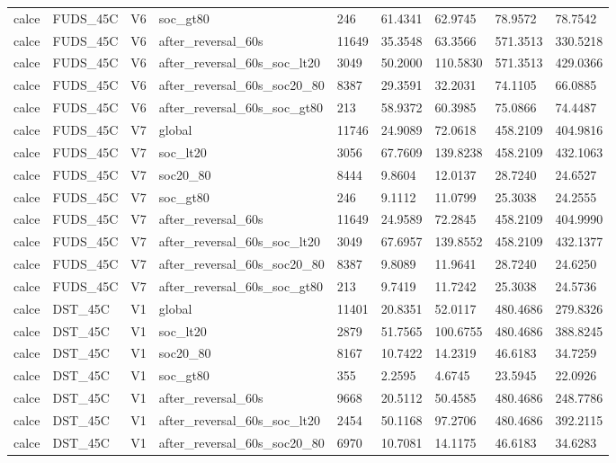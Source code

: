 \begin{tabular}{lllllllll}
calce & FUDS\_45C & V6 & soc\_gt80 & 246 & 61.4341 & 62.9745 & 78.9572 & 78.7542 \\
calce & FUDS\_45C & V6 & after\_reversal\_60s & 11649 & 35.3548 & 63.3566 & 571.3513 & 330.5218 \\
calce & FUDS\_45C & V6 & after\_reversal\_60s\_soc\_lt20 & 3049 & 50.2000 & 110.5830 & 571.3513 & 429.0366 \\
calce & FUDS\_45C & V6 & after\_reversal\_60s\_soc20\_80 & 8387 & 29.3591 & 32.2031 & 74.1105 & 66.0885 \\
calce & FUDS\_45C & V6 & after\_reversal\_60s\_soc\_gt80 & 213 & 58.9372 & 60.3985 & 75.0866 & 74.4487 \\
calce & FUDS\_45C & V7 & global & 11746 & 24.9089 & 72.0618 & 458.2109 & 404.9816 \\
calce & FUDS\_45C & V7 & soc\_lt20 & 3056 & 67.7609 & 139.8238 & 458.2109 & 432.1063 \\
calce & FUDS\_45C & V7 & soc20\_80 & 8444 & 9.8604 & 12.0137 & 28.7240 & 24.6527 \\
calce & FUDS\_45C & V7 & soc\_gt80 & 246 & 9.1112 & 11.0799 & 25.3038 & 24.2555 \\
calce & FUDS\_45C & V7 & after\_reversal\_60s & 11649 & 24.9589 & 72.2845 & 458.2109 & 404.9990 \\
calce & FUDS\_45C & V7 & after\_reversal\_60s\_soc\_lt20 & 3049 & 67.6957 & 139.8552 & 458.2109 & 432.1377 \\
calce & FUDS\_45C & V7 & after\_reversal\_60s\_soc20\_80 & 8387 & 9.8089 & 11.9641 & 28.7240 & 24.6250 \\
calce & FUDS\_45C & V7 & after\_reversal\_60s\_soc\_gt80 & 213 & 9.7419 & 11.7242 & 25.3038 & 24.5736 \\
calce & DST\_45C & V1 & global & 11401 & 20.8351 & 52.0117 & 480.4686 & 279.8326 \\
calce & DST\_45C & V1 & soc\_lt20 & 2879 & 51.7565 & 100.6755 & 480.4686 & 388.8245 \\
calce & DST\_45C & V1 & soc20\_80 & 8167 & 10.7422 & 14.2319 & 46.6183 & 34.7259 \\
calce & DST\_45C & V1 & soc\_gt80 & 355 & 2.2595 & 4.6745 & 23.5945 & 22.0926 \\
calce & DST\_45C & V1 & after\_reversal\_60s & 9668 & 20.5112 & 50.4585 & 480.4686 & 248.7786 \\
calce & DST\_45C & V1 & after\_reversal\_60s\_soc\_lt20 & 2454 & 50.1168 & 97.2706 & 480.4686 & 392.2115 \\
calce & DST\_45C & V1 & after\_reversal\_60s\_soc20\_80 & 6970 & 10.7081 & 14.1175 & 46.6183 & 34.6283 \\

\end{tabular}
